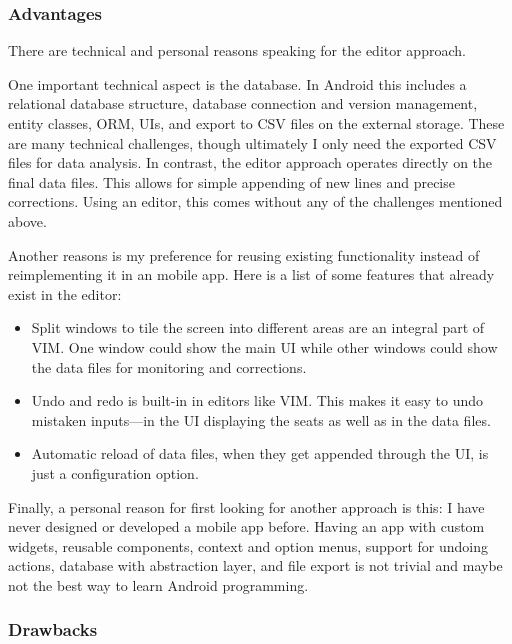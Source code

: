 \subsubsection{Advantages}

There are technical and personal reasons speaking for the editor approach.

One important technical aspect is the database.
In Android this includes a relational database structure, database connection
and version management, entity classes, \acf{ORM}, \aclp{UI}, and export to
\acs{CSV} files on the external storage.
These are many technical challenges, though ultimately I only need the
exported \acs{CSV} files for data analysis.
In contrast, the editor approach operates directly on the final data files.
This allows for simple appending of new lines and precise corrections.
Using an editor, this comes without any of the challenges mentioned above.

Another reasons is my preference for reusing existing functionality instead of
reimplementing it in an mobile app.
Here is a list of some features that already exist in the editor:

\begin{itemize}

  \item Split windows to tile the screen into different areas are an integral
    part of VIM.
    One window could show the main \acs{UI} while other windows could
    show the data files for monitoring and corrections.

  \item Undo and redo is built-in in editors like VIM.
    This makes it easy to undo mistaken inputs---in the \acs{UI} displaying the
    seats as well as in the data files.

  \item Automatic reload of data files, when they get appended through the
    \acs{UI}, is just a configuration option.

\end{itemize}

Finally, a personal reason for first looking for another approach is this:
I have never designed or developed a mobile app before.
Having an app with custom widgets, reusable components, context and option
menus, support for undoing actions, database with abstraction layer, and file
export is not trivial and maybe not the best way to learn Android programming.

\subsubsection{Drawbacks}

